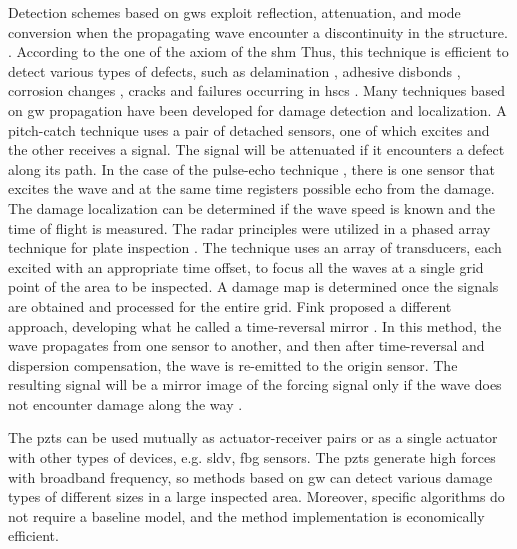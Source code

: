Detection schemes based on \acp{gw} exploit reflection, attenuation, and mode conversion when the propagating wave encounter a discontinuity in the structure. \cite{alleyne1992interaction}.
According to the one of the axiom of the \ac{shm} 
Thus, this technique is efficient to detect various types of defects, such as delamination \cite{sohn2011delamination,tian2015delamination}, adhesive disbonds \cite{rucka2018damage,balasubramaniam2021ultrasonic}, corrosion changes \cite{alleyne1995long,lowe1998defect}, cracks \cite{tua2004detection,lu2006crack,zima2020detection} and failures occurring in \acp{hsc} \cite{mustapha2011assessment, sikdar2016guided, sikdar2016ultrasonic,radzienski2016assessment, yu2019core}.
Many techniques based on \ac{gw} propagation have been developed for damage detection and localization.
A pitch-catch technique \cite{ihn2008pitch, sikdar2017structural} uses a pair of detached sensors, one of which excites and the other receives a signal.
The signal will be attenuated if it encounters a defect along its path.
In the case of the pulse-echo technique \cite{guo1993interaction, kudela2008damage}, there is one sensor that excites the wave and at the same time registers possible echo from the damage.
The damage localization can be determined if the wave speed is known and the time of flight is measured.
The radar principles were utilized in a phased array technique for plate inspection \cite{giurgiutiu2004embedded, ostachowicz2008elastic, kudela2018structural}.
The technique uses an array of transducers, each excited with an appropriate time offset, to focus all the waves at a single grid point of the area to be inspected.
A damage map is determined once the signals are obtained and processed for the entire grid.
Fink proposed a different approach, developing what he called a time-reversal mirror \cite{fink1992time}.
In this method, the wave propagates from one sensor to another, and then after time-reversal and dispersion compensation, the wave is re-emitted to the origin sensor.
The resulting signal will be a mirror image of the forcing signal only if the wave does not encounter damage along the way \cite{park2007time, eremin2016analytically}.

The \acp{pzt} can be used mutually as actuator-receiver pairs or as a single actuator with other types of devices, e.g. \ac{sldv}, \ac{fbg} sensors.
The \acp{pzt} generate high forces with broadband frequency, so methods based on \ac{gw} can detect various damage types of different sizes in a large inspected area.
Moreover, specific algorithms do not require a baseline model, and the method implementation is economically efficient.

